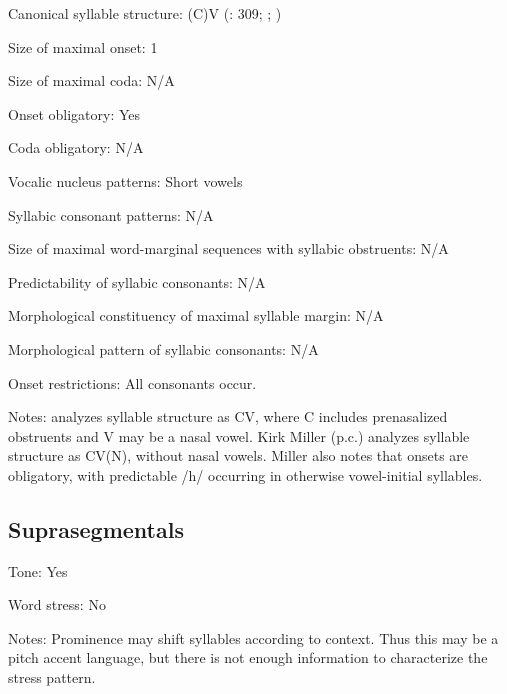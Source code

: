 {\begin{appendixdesc}
\item[Canonical syllable structure:] (C)V (\citealt{TuckerWoodburn1977}: 309; \citealt{SandsEtAl1996}; \citealt{Sands2013})

\item[Size of maximal onset:] 1

\item[Size of maximal coda:] N/A

\item[Onset obligatory:] Yes

\item[Coda obligatory:] N/A

\item[Vocalic nucleus patterns:] Short vowels

\item[Syllabic consonant patterns:] N/A

\item[Size of maximal word-marginal sequences with syllabic obstruents:] N/A

\item[Predictability of syllabic consonants:] N/A

\item[Morphological constituency of maximal syllable margin:] N/A

\item[Morphological pattern of syllabic consonants:] N/A

\item[Onset restrictions:] All consonants occur.

\item[Notes:] \citet{Sands2013} analyzes syllable structure as CV, where C includes prenasalized obstruents and V may be a nasal vowel. Kirk Miller (p.c.) analyzes syllable structure as CV(N), without nasal vowels. Miller also notes that onsets are obligatory, with predictable /h/ occurring in otherwise vowel-initial syllables.
\end{appendixdesc}
\subsection*{Suprasegmentals}
\begin{appendixdesc}
\item[Tone:] Yes

\item[Word stress:] No

\item[Notes:] Prominence may shift syllables according to context. Thus this may be a pitch accent language, but there is not enough information to characterize the stress pattern.
\end{appendixdesc}
}
